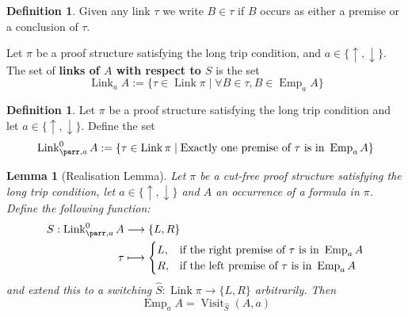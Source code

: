 \documentclass[12pt]{article}
\theoremstyle{plain}
\newtheorem{lemma}[thm]{Lemma}
\theoremstyle{definition}
\newtheorem{defn}[thm]{Definition} %
\newcommand{\lto}{\longrightarrow}
\begin{document}
	\begin{defn}
		Given any link $\tau$ we write $B \in \tau$ if $B$ occurs as either a premise or a conclusion of $\tau$.
		
		Let $\pi$ be a proof structure satisfying the long trip condition, and $a \in \lbrace \uparrow, \downarrow\rbrace$. The set of \textbf{links of $A$ with respect to $S$} is the set
		\begin{equation}
			\operatorname{Link}_aA := \lbrace \tau \in \operatorname{Link}\pi \mid \forall B \in \tau, B \in \operatorname{Emp}_aA \rbrace
		\end{equation}
	\end{defn}
	\begin{defn}
		Let $\pi$ be a proof structure satisfying the long trip condition and let $a \in \lbrace \uparrow, \downarrow \rbrace$. Define the set
		\begin{equation}
			\operatorname{Link}^0_{\parr,a}A := \lbrace \tau \in \operatorname{Link}\pi \mid \text{Exactly one premise of }\tau\text{ is in }\operatorname{Emp}_{a}A\rbrace
		\end{equation}
	\end{defn}
	\begin{lemma}[Realisation Lemma]\label{lem:realisation_switching}
		Let $\pi$ be a cut-free proof structure satisfying the long trip condition, let $a \in \lbrace \uparrow, \downarrow \rbrace$ and $A$ an occurrence of a formula in $\pi$. Define the following function:
		\begin{align*}
			S: \operatorname{Link}_{\parr,a}^0A &\lto \lbrace L,R\rbrace\\
			\tau &\longmapsto
			\begin{cases}
				L, & \text{if the right premise of }\tau\text{ is in }\operatorname{Emp}_{a}A\\
				R, & \text{if the left premise of }\tau\text{ is in }\operatorname{Emp}_{a}A
			\end{cases}
		\end{align*}
		and extend this to a switching $\hat{S}: \operatorname{Link}\pi \lto \lbrace L,R \rbrace$ arbitrarily. Then
		\begin{equation}
			\operatorname{Emp}_aA = \operatorname{Visit}_{\hat{S}}(A,a)
		\end{equation}
	\end{lemma}
\end{document}
